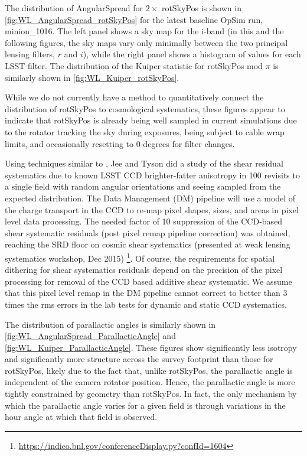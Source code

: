 The distribution of AngularSpread for $2 \times$ rotSkyPos is shown in
\autoref{fig:WL_AngularSpread_rotSkyPos} for the latest baseline OpSim run,
minion\_1016.  The left panel shows a sky map for the i-band (in this and the
following figures, the sky maps vary only minimally between the two principal
lensing filters, $r$ and $i$), while the right panel shows a histogram of values
for each LSST filter.  The distribution of the Kuiper statistic for rotSkyPos
mod $\pi$ is similarly shown in \autoref{fig:WL_Kuiper_rotSkyPos}.

While we do not currently have a method to quantitatively connect the
distribution of rotSkyPos to cosmological systematics, these figures appear to
indicate that rotSkyPos is already being well sampled in current simulations due
to the rotator tracking the sky during exposures, being subject to cable wrap
limits, and occasionally resetting to 0-degrees for filter changes.

Using techniques similar to \citet{Jee&Tyson2011}, Jee and Tyson did a study of
the shear residual systematics due to known LSST CCD brighter-fatter anisotropy
in 100 revisits to a single field with random angular orientations and seeing
sampled from the expected distribution.  The Data Management (DM) pipeline will
use a model of the charge transport in the CCD to re-map pixel shapes, sizes,
and areas in pixel level data processing.  The needed factor of 10 suppression
of the CCD-based shear systematic residuals (post pixel remap pipeline
correction) was obtained, reaching the SRD floor on cosmic shear systematics
(presented at weak lensing systematics workshop, Dec 2015)
\footnote{\url{https://indico.bnl.gov/conferenceDisplay.py?confId=1604}}.  Of
course, the requirements for spatial dithering for shear systematics residuals
depend on the precision of the pixel processing for removal of the CCD based
additive shear systematic.  We assume that this pixel level remap in the DM
pipeline cannot correct to better than 3 times the rms errors in the lab tests
for dynamic and static CCD systematics.

The distribution of parallactic angles is similarly shown in
\autoref{fig:WL_AngularSpread_ParallacticAngle} and
\autoref{fig:WL_Kuiper_ParallacticAngle}.  These figures show significantly less
isotropy and significantly more structure across the survey footprint than those
for rotSkyPos, likely due to the fact that, unlike rotSkyPos, the parallactic
angle is independent of the camera rotator position.  Hence, the parallactic
angle is more tightly constrained by geometry than rotSkyPos.  In fact, the only
mechanism by which the parallactic angle varies for a given field is through
variations in the hour angle at which that field is observed.

